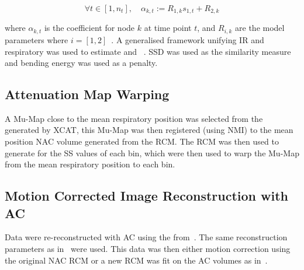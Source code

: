         \vspace{-0.25cm}
        
        \begin{equation}
            \forall t \in [1, n_t],\quad \alpha_{k, t} := R_{1, k} s_{1, t} + R_{2, k}
        \end{equation}
        
        \vspace{-0.025cm}
        
        \noindent where $\alpha_{k, t}$ is the coefficient for node $k$ at time point $t$, and $R_{i, k}$ are the model parameters where $i = [1, 2]$~\cite{McClelland2017}. A generalised framework unifying \gls{IR} and respiratory  was used to estimate  and ~\cite{McClelland2017}. \gls{SSD} was used as the similarity measure and bending energy was used as a penalty.%
    
    \vspace{-0.5cm}
    
    \subsection{Attenuation Map Warping} \label{sec:attenuation_map_warping}
        A \gls{Mu-Map} close to the mean respiratory position was selected from the  generated by \gls{XCAT}, this \gls{Mu-Map} was then registered (using \gls{NMI}) to the mean position NAC volume generated from the \gls{RCM}.
        The \gls{RCM} was then used to generate  for the \gls{SS} values of each bin, which were then used to warp the \gls{Mu-Map} from the mean respiratory position to each bin.
    
    \vspace{-0.5cm}
    
    \subsection{Motion Corrected Image Reconstruction with AC} \label{sec:attenuation_corrected_image_reconstruction}
        Data were re-reconstructed with \gls{AC} using the  from~. The same reconstruction parameters as in~ were used. This data was then either motion correction using the original \gls{NAC} \gls{RCM} or a new \gls{RCM} was fit on the \gls{AC} volumes as in~.
    
